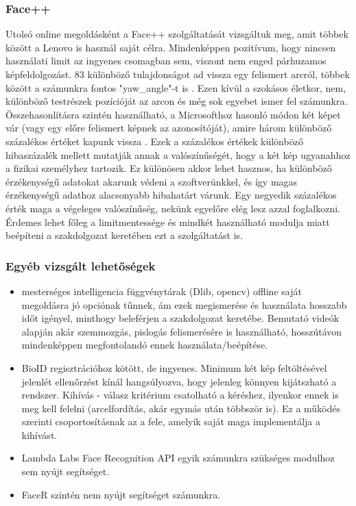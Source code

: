 \subsubsection{Face++}
Utolsó online megoldásként a Face++ szolgáltatását vizsgáltuk meg, amit többek között a Lenovo is használ saját célra. Mindenképpen pozitívum, hogy nincsen használati limit az ingyenes csomagban sem, viszont nem enged párhuzamos képfeldolgozást. 83 különböző tulajdonságot ad vissza egy felismert arcról, többek között a számunkra fontos "yaw\_angle"-t is \cite{FACEPP}. Ezen kívül a szokásos életkor, nem, különböző testrészek pozícióját az arcon és még sok egyebet ismer fel számunkra.
\\Összehasonlításra szintén használható, a Microsofthoz hasonló módon két képet vár (vagy egy előre felismert képnek az azonosítóját), amire három különböző százalékos értéket kapunk vissza \cite{FACEPP_COMPARE}. Ezek a százalékos értékek különböző hibaszázalék mellett mutatják annak a valószínűségét, hogy a két kép ugyanahhoz a fizikai személyhez tartozik. Ez különösen akkor lehet hasznos, ha különböző érzékenységű adatokat akarunk védeni a szoftverünkkel, és így magas érzékenységű adathoz alacsonyabb hibahatárt várunk. Egy negyedik százalékos érték maga a végeleges valószínűség, nekünk egyelőre elég lesz azzal foglalkozni. Érdemes lehet főleg a limitmentessége és mindkét használható modulja miatt beépíteni a szakdolgozat keretében ezt a szolgáltatást is. 

\subsubsection{Egyéb vizsgált lehetőségek}

\begin{itemize}
\item mesterséges intelligencia függvénytárak (Dlib, opencv) offline saját megoldásra jó opciónak tűnnek, ám ezek megismerése és használata hosszabb időt igényel, minthogy beleférjen a szakdolgozat keretébe. Bemutató videók alapján akár szemmozgás, pislogás felismerésére is használható, hosszútávon mindenképpen megfontolandó ennek használata/beépítése.
\item BioID regisztrációhoz kötött, de ingyenes. Minimum két kép feltöltésével jelenlét ellenőrzést kínál hangsúlyozva, hogy jelenleg könnyen kijátszható a rendszer. Kihívás - válasz kritérium csatolható a kéréshez, ilyenkor ennek is meg kell felelni (arcelfordítás, akár egymás után többször is). Ez a működés szerinti csoportosításnak az a fele, amelyik saját maga implementálja a kihívást.
\item Lambda Labs Face Recognition API egyik számunkra szükséges modulhoz sem nyújt segítséget.
\item FaceR szintén nem nyújt segítséget számunkra.
\end{itemize}

